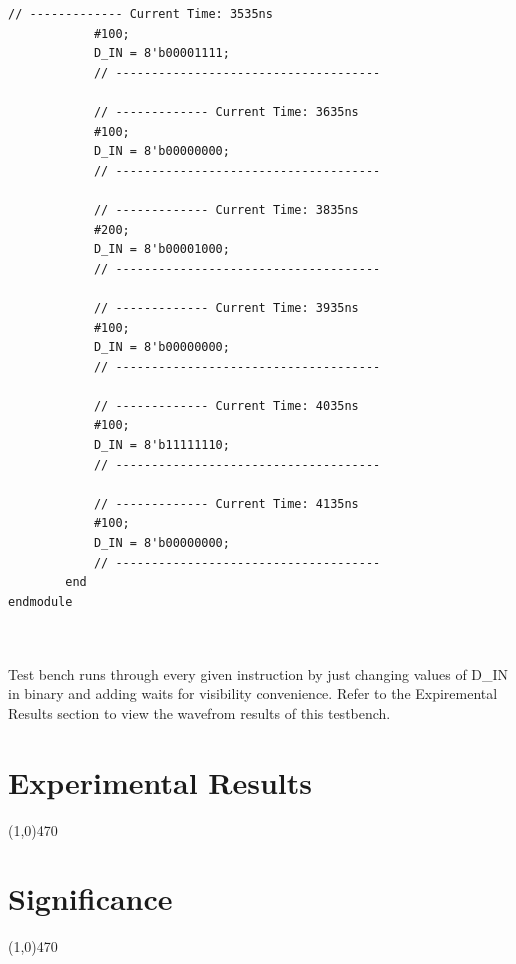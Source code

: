 \documentclass[12pt]{article}
\begin{document}
\begin{Verbatim}[frame=single, fontsize= \small]
			// ------------- Current Time: 3535ns 
			#100;
			D_IN = 8'b00001111;
			// -------------------------------------
			
			// ------------- Current Time: 3635ns 
			#100;
			D_IN = 8'b00000000;
			// -------------------------------------
			
			// ------------- Current Time: 3835ns 
			#200;
			D_IN = 8'b00001000;
			// -------------------------------------
			
			// ------------- Current Time: 3935ns 
			#100;
			D_IN = 8'b00000000;
			// -------------------------------------
			
			// ------------- Current Time: 4035ns 
			#100;
			D_IN = 8'b11111110;
			// -------------------------------------
			
			// ------------- Current Time: 4135ns 
			#100;
			D_IN = 8'b00000000;
			// -------------------------------------
		end 
endmodule

	
		\end{Verbatim}
		Test bench runs through every given instruction by just changing values of D\_IN in binary and adding waits for visibility convenience. Refer to the Expiremental Results section to view the wavefrom results of this testbench.
\newpage			
\section{Experimental Results}\vspace{-.7cm} \line(1,0){470}


	\newpage
\section{Significance} \vspace{-.7cm} \line(1,0){470}
\end{document}
